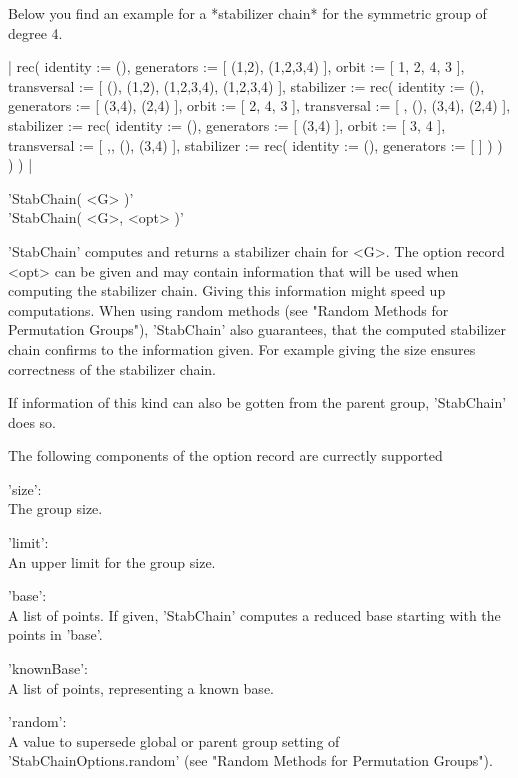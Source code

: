 Below you  find  an  example for  a *stabilizer chain* for the  symmetric
group of degree 4.

|    rec(
        identity    := (),
        generators  := [ (1,2), (1,2,3,4) ],
        orbit       := [ 1, 2, 4, 3 ],
        transversal := [ (), (1,2), (1,2,3,4), (1,2,3,4) ],
        stabilizer := rec(
            identity    := (),
            generators  := [ (3,4), (2,4) ],
            orbit       := [ 2, 4, 3 ],
            transversal := [ , (), (3,4), (2,4) ],
            stabilizer := rec(
                identity    := (),
                generators  := [ (3,4) ],
                orbit       := [ 3, 4 ],
                transversal := [ ,, (), (3,4) ],
                stabilizer := rec(
                    identity   := (),
                    generators := [  ]
                )
            )
        )
    ) |


'StabChain( <G> )'\\
'StabChain( <G>, <opt> )'

'StabChain' computes and returns a stabilizer chain for <G>. The option
record <opt> can be given and may contain information that will be used
when computing the stabilizer chain.
Giving this information might speed up computations. When using random
methods (see "Random Methods for Permutation Groups"), 'StabChain' also
guarantees, that the computed stabilizer chain confirms to the information
given. For example giving the size ensures correctness of the stabilizer
chain.

If information of this kind can also be gotten from the parent group,
'StabChain' does so.

The following components of the option record are currectly supported\:

'size':\\
   The group size.

'limit':\\
   An upper limit for the group size.

'base':\\
   A list of points. If given, 'StabChain' computes a reduced base starting
   with the points in 'base'.

'knownBase':\\
   A list of points, representing a known base.

'random':\\
  A value to supersede global or parent group setting of
  'StabChainOptions.random' (see "Random Methods for Permutation Groups").

